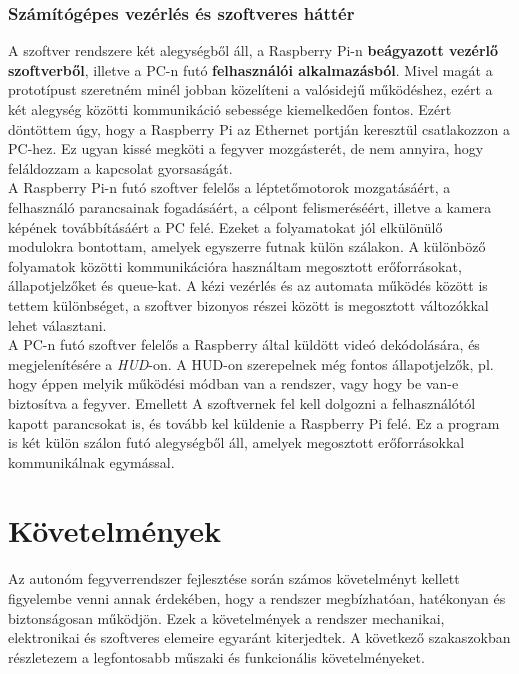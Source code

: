 \subsubsection*{Számítógépes vezérlés és szoftveres háttér}
A szoftver rendszere két alegységből áll, a Raspberry Pi-n \textbf{beágyazott vezérlő szoftverből}, illetve a PC-n futó \textbf{felhasználói alkalmazásból}. Mivel magát a prototípust szeretném minél jobban közelíteni a valósidejű működéshez, ezért a két alegység közötti kommunikáció sebessége kiemelkedően fontos. Ezért döntöttem úgy, hogy a Raspberry Pi az Ethernet portján keresztül csatlakozzon a PC-hez. Ez ugyan kissé megköti a fegyver mozgásterét, de nem annyira, hogy feláldozzam a kapcsolat gyorsaságát. \\

A Raspberry Pi-n futó szoftver felelős a léptetőmotorok mozgatásáért, a felhasználó parancsainak fogadásáért, a célpont felismeréséért, illetve a  kamera képének továbbításáért a PC felé. Ezeket a folyamatokat jól elkülönülő modulokra bontottam, amelyek egyszerre futnak külön szálakon. A különböző folyamatok közötti kommunikációra használtam megosztott erőforrásokat, állapotjelzőket és queue-kat. A kézi vezérlés és az automata működés között is tettem különbséget, a szoftver bizonyos részei között is megosztott változókkal lehet választani. \\

A PC-n futó szoftver felelős a Raspberry által küldött videó dekódolására, és megjelenítésére a \textsl{HUD}-on. A HUD-on szerepelnek még fontos állapotjelzők, pl. hogy éppen melyik működési módban van a rendszer, vagy hogy be van-e biztosítva a fegyver. Emellett A szoftvernek fel kell dolgozni a felhasználótól kapott parancsokat is, és tovább kel küldenie a Raspberry Pi felé. Ez a program is két külön szálon futó alegységből áll, amelyek megosztott erőforrásokkal kommunikálnak egymással. 

\pagebreak

\section{Követelmények}\label{sec:kov}


Az autonóm fegyverrendszer fejlesztése során számos követelményt kellett figyelembe venni annak érdekében, hogy a rendszer megbízhatóan, hatékonyan és biztonságosan működjön. Ezek a követelmények a rendszer mechanikai, elektronikai és szoftveres elemeire egyaránt kiterjedtek. A következő szakaszokban részletezem a legfontosabb műszaki és funkcionális követelményeket.

